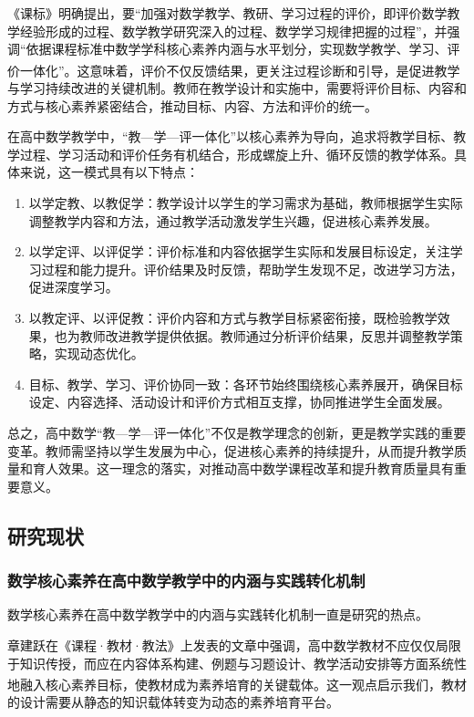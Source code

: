 \documentclass[UTF8,a4paper,12pt,twoside]{ctexart}
\begin{document}
《课标》明确提出，要“加强对数学教学、教研、学习过程的评价，即评价数学教学经验形成的过程、数学教学研究深入的过程、数学学习规律把握的过程”，并强调“依据课程标准中数学学科核心素养内涵与水平划分，实现数学教学、学习、评价一体化”\textsuperscript{\cite{gaozhong_kebiao}}。这意味着，评价不仅反馈结果，更关注过程诊断和引导，是促进教学与学习持续改进的关键机制。教师在教学设计和实施中，需要将评价目标、内容和方式与核心素养紧密结合，推动目标、内容、方法和评价的统一。

在高中数学教学中，“教—学—评一体化”以核心素养为导向，追求将教学目标、教学过程、学习活动和评价任务有机结合，形成螺旋上升、循环反馈的教学体系。具体来说，这一模式具有以下特点：

\begin{enumerate}
\item 以学定教、以教促学：教学设计以学生的学习需求为基础，教师根据学生实际调整教学内容和方法，通过教学活动激发学生兴趣，促进核心素养发展。
\item 以学定评、以评促学：评价标准和内容依据学生实际和发展目标设定，关注学习过程和能力提升。评价结果及时反馈，帮助学生发现不足，改进学习方法，促进深度学习。
\item 以教定评、以评促教：评价内容和方式与教学目标紧密衔接，既检验教学效果，也为教师改进教学提供依据。教师通过分析评价结果，反思并调整教学策略，实现动态优化。
\item 目标、教学、学习、评价协同一致：各环节始终围绕核心素养展开，确保目标设定、内容选择、活动设计和评价方式相互支撑，协同推进学生全面发展。
\end{enumerate}

总之，高中数学“教—学—评一体化”不仅是教学理念的创新，更是教学实践的重要变革。教师需坚持以学生发展为中心，促进核心素养的持续提升，从而提升教学质量和育人效果。这一理念的落实，对推动高中数学课程改革和提升教育质量具有重要意义。

\subsection{研究现状}

\subsubsection{数学核心素养在高中数学教学中的内涵与实践转化机制}
数学核心素养在高中数学教学中的内涵与实践转化机制一直是研究的热点。

章建跃在《课程·教材·教法》上发表的文章中强调，高中数学教材不应仅仅局限于知识传授，而应在内容体系构建、例题与习题设计、教学活动安排等方面系统性地融入核心素养目标，使教材成为素养培育的关键载体\textsuperscript{\cite{zhang2016}}。这一观点启示我们，教材的设计需要从静态的知识载体转变为动态的素养培育平台。
\end{document}
